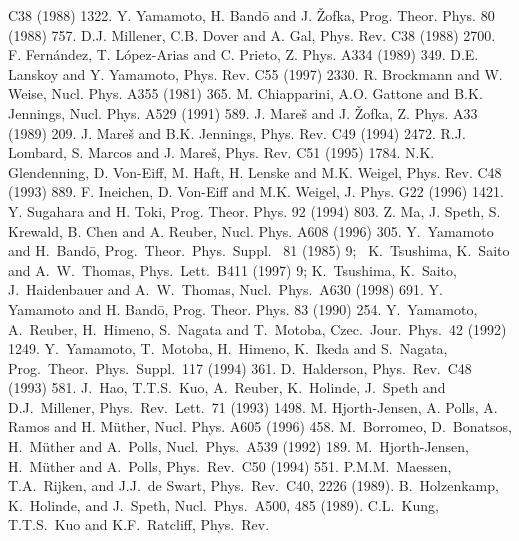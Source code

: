 \begin{references}
C38 (1988) 1322.
Y. Yamamoto, H. Band\={o} and J. \v{Z}ofka, Prog. Theor. Phys. 80
(1988) 757.
D.J. Millener, C.B. Dover and A. Gal, Phys. Rev. C38 (1988) 2700.
F. Fern\'andez, T. L\'opez-Arias and C. Prieto, Z. Phys. A334 (1989) 349.
D.E. Lanskoy and Y. Yamamoto, Phys. Rev. C55 (1997) 2330.
R. Brockmann and W. Weise, Nucl. Phys. A355 (1981) 365.
M. Chiapparini, A.O. Gattone and B.K. Jennings, Nucl. Phys. A529
(1991) 589.
J. Mare\v{s} and J. \v{Z}ofka, Z. Phys. A33 (1989) 209.
J. Mare\v{s} and B.K. Jennings, Phys. Rev. C49 (1994) 2472. 
R.J. Lombard, S. Marcos and J. Mare\v{s}, Phys. Rev. C51 (1995) 1784. 
N.K. Glendenning, D. Von-Eiff, M. Haft, H. Lenske and M.K. Weigel,
Phys. Rev. C48 (1993) 889.
F. Ineichen, D. Von-Eiff and M.K. Weigel, J. Phys. G22 (1996) 1421.
Y. Sugahara and H. Toki, Prog. Theor. Phys. 92 (1994) 803.
Z. Ma, J. Speth, S. Krewald, B. Chen and A. Reuber, Nucl. Phys.
A608 (1996) 305.
Y.\ Yamamoto and H.\ Band\={o}, Prog.\ Theor.\ Phys.\ Suppl. \ 81
(1985) 9; \ K.\ Tsushima, K.\ Saito and A.\ W.\ Thomas, Phys.\ Lett.\ B411 (1997) 9;
K.\ Tsushima, K.\ Saito, J.\ Haidenbauer and A.\ W.\ Thomas, Nucl.\ Phys.\ A630 (1998) 691.  
Y. Yamamoto and H. Band\={o}, Prog. Theor. Phys. 83 (1990) 254.
Y.\ Yamamoto, A.\ Reuber, H.\ Himeno, S.\ Nagata and T.\ Motoba, Czec.\
Jour.\ Phys.\ 42 (1992) 1249.
 Y.\ Yamamoto, T.\ Motoba, H.\ Himeno,
K.\ Ikeda and S.\ Nagata, Prog.\ Theor.\ Phys.\ Suppl.\ 117 (1994)
361.
D.\ Halderson, Phys.\ Rev.\ C48 (1993) 581.
J.\ Hao, T.T.S.\ Kuo, A.\ Reuber, K.\ Holinde, J.\ Speth and D.J.\ Millener,
Phys.\ Rev.\ Lett.\ 71 (1993) 1498.
M. Hjorth-Jensen, A. Polls, A. Ramos and H. M\"{u}ther,
Nucl. Phys. A605 (1996) 458.
M.\ Borromeo, D.\ Bonatsos, H.\ M\"{u}ther and A.\ Polls,
Nucl.\ Phys.\ A539 (1992) 189.
M.\ Hjorth-Jensen, H.\ M\"{u}ther
and A.\ Polls, Phys.\ Rev.\ C50 (1994) 551.
P.M.M.\ Maessen, T.A.\ Rijken, and J.J.\ de Swart, Phys.\ Rev.\
C40, 2226 (1989).
\bibitem{juelich}
B.\ Holzenkamp, K.\ Holinde, and J.\ Speth, Nucl.\ Phys.\ A500, 485
(1989).
\bibitem{kkr79} C.L.\ Kung, T.T.S.\ Kuo and K.F.\ Ratcliff, Phys.\ Rev.\

\end{references}
